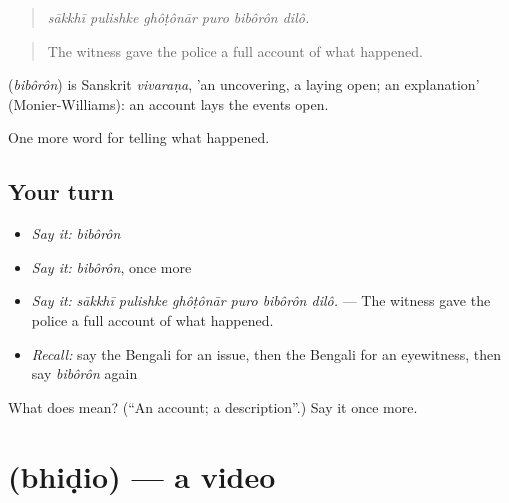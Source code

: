 \begin{quote}
     
\end{quote}

\begin{quote}
\emph{sākkhī pulishke ghôṭônār puro bibôrôn dilô.}
\end{quote}

\begin{quote}
The witness gave the police a full account of what happened.
\end{quote}

\begin{cousinweb}
\textbf{} (\emph{bibôrôn}) is Sanskrit \emph{vivaraṇa}, 'an uncovering, a laying open; an explanation' (Monier-Williams): an account lays the events open.
\end{cousinweb}

\begin{grammarlens}[title={What you've built}]
One more word for telling what happened.
\end{grammarlens}

\subsection*{Your turn}
\begin{itemize}
\raggedright
  \item \emph{Say it:} \emph{bibôrôn}
  \item \emph{Say it:} \emph{bibôrôn}, once more
  \item \emph{Say it:} \emph{sākkhī pulishke ghôṭônār puro bibôrôn dilô.} — The witness gave the police a full account of what happened.
  \item \emph{Recall:} say the Bengali for an issue, then the Bengali for an eyewitness, then say \emph{bibôrôn} again
\end{itemize}

\begin{tcolorbox}[breakable,colback=teal!4,colframe=teal!35!black,title={Before you move on}]
What does  mean? (\textquotedblleft{}An account; a description\textquotedblright{}.) Say it once more.
\end{tcolorbox}
\section[\texorpdfstring{\bn{ভিডিও} (bhiḍio)}{ভিডিও (bhiḍio)}]{ (bhiḍio) — a video}

